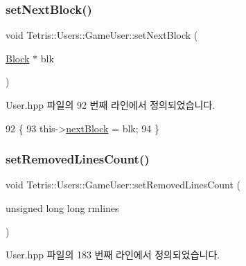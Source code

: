\subsubsection{\texorpdfstring{set\+Next\+Block()}{setNextBlock()}\hspace{0.1cm}{\footnotesize\ttfamily [2/2]}}
{\footnotesize\ttfamily void Tetris\+::\+Users\+::\+Game\+User\+::set\+Next\+Block (\begin{DoxyParamCaption}\item[{\hyperlink{class_tetris_1_1_block}{Block} $\ast$}]{blk }\end{DoxyParamCaption})\hspace{0.3cm}{\ttfamily [inline]}}



User.\+hpp 파일의 92 번째 라인에서 정의되었습니다.


\begin{DoxyCode}
92                                              \{
93                     this->\hyperlink{class_tetris_1_1_users_1_1_game_user_a49be97be588cd4b6438f06ec693787d5}{nextBlock} = blk;
94                 \}
\end{DoxyCode}
\mbox{\label{class_tetris_1_1_users_1_1_game_user_a298debc64e974b4f626e8f77687ea503}} 
\subsubsection{\texorpdfstring{set\+Removed\+Lines\+Count()}{setRemovedLinesCount()}}
{\footnotesize\ttfamily void Tetris\+::\+Users\+::\+Game\+User\+::set\+Removed\+Lines\+Count (\begin{DoxyParamCaption}\item[{unsigned long long}]{rmlines }\end{DoxyParamCaption})\hspace{0.3cm}{\ttfamily [inline]}}



User.\+hpp 파일의 183 번째 라인에서 정의되었습니다.


